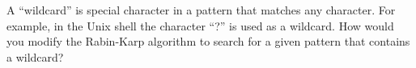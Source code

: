 A ``wildcard'' is special character in a pattern that matches any
character. For example, in the Unix shell the character ``?'' is 
used as a wildcard. How would you modify the Rabin-Karp algorithm
to search for a given pattern that contains a wildcard?
